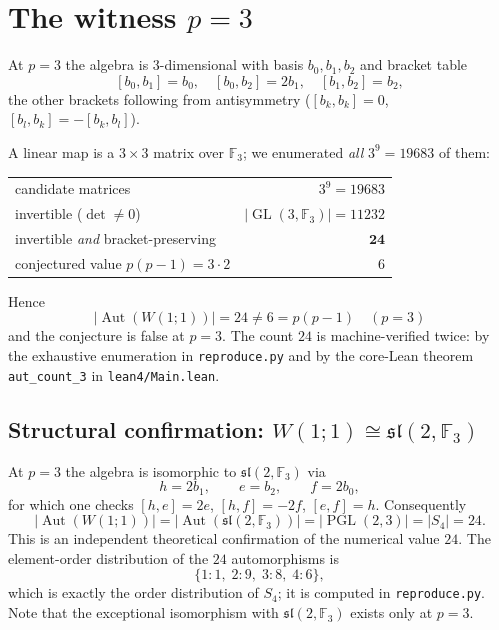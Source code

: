 \documentclass[11pt]{article}
\theoremstyle{definition}
\theoremstyle{remark}
\newcommand{\Aut}{\operatorname{Aut}}
\newcommand{\GL}{\operatorname{GL}}
\begin{document}
\section{The witness $p=3$}

At $p=3$ the algebra is $3$-dimensional with basis $b_0,b_1,b_2$ and bracket
table
\[
[b_0,b_1]=b_0,\quad [b_0,b_2]=2b_1,\quad [b_1,b_2]=b_2,
\]
the other brackets following from antisymmetry ($[b_k,b_k]=0$,
$[b_l,b_k]=-[b_k,b_l]$).

A linear map is a $3\times 3$ matrix over $\mathbb{F}_3$; we enumerated
\emph{all} $3^9 = 19683$ of them:

\begin{center}
\begin{tabular}{l r}
\toprule
candidate matrices & $3^9 = 19683$ \\
invertible ($\det \ne 0$) & $|\GL(3,\mathbb{F}_3)| = 11232$ \\
invertible \emph{and} bracket-preserving & $\mathbf{24}$ \\
conjectured value $p(p-1) = 3\cdot 2$ & $6$ \\
\bottomrule
\end{tabular}
\end{center}

Hence
\[
\boxed{\;|\Aut(W(1;1))| = 24 \ne 6 = p(p-1) \quad (p=3)\;}
\]
and the conjecture is false at $p=3$. The count $24$ is machine-verified twice:
by the exhaustive enumeration in \texttt{reproduce.py} and by the core-Lean
theorem \texttt{aut\_count\_3} in \texttt{lean4/Main.lean}.

\subsection*{Structural confirmation: $W(1;1)\cong \mathfrak{sl}(2,\mathbb{F}_3)$}

At $p=3$ the algebra is isomorphic to $\mathfrak{sl}(2,\mathbb{F}_3)$ via
\[
h = 2b_1, \qquad e = b_2, \qquad f = 2b_0 ,
\]
for which one checks $[h,e]=2e$, $[h,f]=-2f$, $[e,f]=h$. Consequently
\[
|\Aut(W(1;1))| = |\Aut(\mathfrak{sl}(2,\mathbb{F}_3))|
= |\operatorname{PGL}(2,3)| = |S_4| = 24 .
\]
This is an independent theoretical confirmation of the numerical value $24$.
The element-order distribution of the $24$ automorphisms is
\[
\{1:1,\; 2:9,\; 3:8,\; 4:6\},
\]
which is exactly the order distribution of $S_4$; it is computed in
\texttt{reproduce.py}. Note that the exceptional isomorphism with
$\mathfrak{sl}(2,\mathbb{F}_3)$ exists only at $p=3$.
\end{document}
